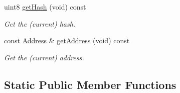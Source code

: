 \begin{DoxyCompactItemize}
uint8 \mbox{\hyperlink{class_dynamic_hash_ae25a2b1eca6a505bcb4e97b67eb1b2e7}{get\+Hash}} (void) const
\begin{DoxyCompactList}\small\item\em Get the (current) hash. \end{DoxyCompactList}\item 
const \mbox{\hyperlink{class_address}{Address}} \& \mbox{\hyperlink{class_dynamic_hash_a304ee882e7ad7f4edd33bda810622cb2}{get\+Address}} (void) const
\begin{DoxyCompactList}\small\item\em Get the (current) address. \end{DoxyCompactList}\end{DoxyCompactItemize}
\subsection*{Static Public Member Functions}
